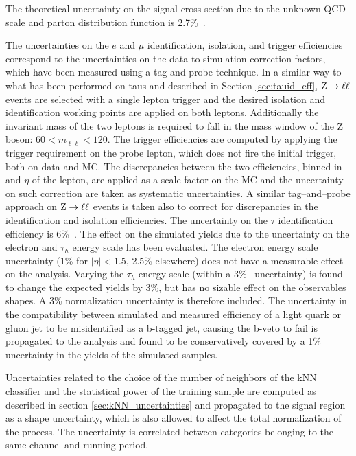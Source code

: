 The theoretical uncertainty on the signal cross section due to the unknown QCD scale and parton distribution function is 2.7\%~\cite{LHCHiggsCrossSectionWorkingGroup:2011ti}.

The uncertainties on the $e$ and $\mu$ identification, isolation, and trigger efficiencies correspond to the uncertainties on the data-to-simulation correction factors, which have been measured using a tag-and-probe technique. In a similar way to what has been performed on taus and described in Section \ref{sec:tauid_eff}, $\mathrm{Z} \rightarrow \ell \ell$ events are selected with a single lepton trigger and the desired isolation and identification working points are applied on both leptons. Additionally the invariant mass of the two leptons is required to fall in the mass window of the Z boson: $60 < m_{\ell\ell} < 120$. The trigger efficiencies are computed by applying the trigger requirement on the probe lepton, which does not fire the initial trigger, both on data and MC. The discrepancies between the two efficiencies, binned in \pT and $\eta$ of the lepton, are applied as a scale factor on the MC and the uncertainty on such correction are taken as systematic uncertainties. A similar tag--and--probe approach on $\mathrm{Z} \rightarrow \ell \ell$ events is taken also to correct for discrepancies in the identification and isolation efficiencies.
The uncertainty on the $\tau$ identification efficiency is 6\%~\cite{CMS-PAS-TAU-11-001}.
The effect on the simulated yields due to the uncertainty on the electron and $\tau_h$ energy scale has been evaluated.
The electron energy scale uncertainty (1\% for $|\eta| < 1.5$, 2.5\% elsewhere) does not have a measurable effect on the analysis.
Varying the $\tau_h$ energy scale (within a 3\%~\cite{H_tautau} uncertainty) is found to change the expected yields by $3\%$, but has no sizable effect on the observables shapes. A 3\% normalization uncertainty is therefore included.
The uncertainty in the compatibility between simulated and measured efficiency of a light quark or gluon jet to be misidentified as a b-tagged jet, causing the b-veto to 
fail is propagated to the analysis and found to be conservatively covered by a 1\% uncertainty in the yields of the simulated samples.

Uncertainties related to the choice of the number of neighbors of the kNN classifier and the statistical power of the training sample are computed as described in section \ref{sec:kNN_uncertainties} and propagated to the signal region as a shape uncertainty, which is also allowed to affect the total normalization of the process. The uncertainty is correlated between categories belonging to the same channel and running period.

